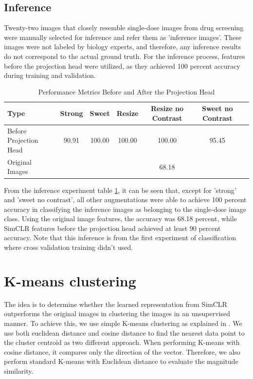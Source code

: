 \subsection{Inference}

Twenty-two images that closely resemble single-dose images from drug screening were manually selected for inference and refer them as 'inference images'. These images were not labeled by biology experts, and therefore, any inference results do not correspond to the actual ground truth. For the inference process, features before the projection head were utilized, as they achieved 100 percent accuracy during training and validation.
\begin{table}[H]
    \centering
    \begin{tabular}{@{}lcccccc@{}}
    \toprule
    \textbf{Type} & \textbf{Strong} & \textbf{Sweet} & \textbf{Resize} & \textbf{Resize no Contrast} & \textbf{Sweet no Contrast} \\ \midrule
    Before Projection Head & 90.91 & 100.00 & 100.00 & 100.00 & 95.45 \\ \midrule
    Original Images & & & & 68.18 & \\ \bottomrule
    \end{tabular}
    \caption{Performance Metrics Before and After the Projection Head}
    \label{tab:performance_metrics}
\end{table}

From the inference experiment table \ref{tab:performance_metrics}, it can be seen that, except for 'strong' and 'sweet no contrast', all other augmentations were able to achieve 100 percent accuracy in classifying the inference images as belonging to the single-dose image class. Using the original image features, the accuracy was 68.18 percent, while SimCLR features before the projection head achieved at least 90 percent accuracy. Note that this inference is from the first experiment of classification where cross validation training didn't used.
\section{K-means clustering}

The idea is to determine whether the learned representation from SimCLR outperforms the original images in clustering the images in an unsupervised manner. To achieve this, we use simple K-means clustering as explained in \cite{bishop:2006:PRML}. We use both euclidean distance and cosine distance to find the nearest data point to the cluster centroid as two different approach. When performing K-means with cosine distance, it compares only the direction of the vector. Therefore, we also perform standard K-means with Euclidean distance to evaluate the magnitude similarity. 


